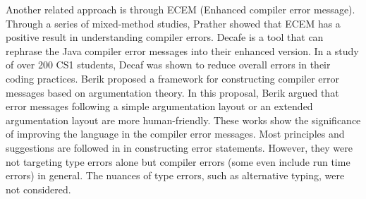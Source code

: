 Another related approach is through ECEM (Enhanced compiler error message). Through a series of mixed-method studies, Prather showed \cite{prather_novices_2017} that ECEM has a positive result in understanding compiler errors. Decafe \cite{becker_effective_2016} is a tool that can rephrase the Java compiler error messages into their enhanced version. In a study of over 200 CS1 students, Decaf was shown to reduce overall errors in their coding practices. Berik proposed a framework \cite{barik_how_2018} for constructing compiler error messages based on argumentation theory. In this proposal,  Berik argued that error messages following a simple argumentation layout or an extended argumentation layout are more human-friendly.  These works show the significance of improving the language in the compiler error messages. Most principles and suggestions are followed in \chameleon{} in constructing error statements. However, they were not targeting type errors alone but compiler errors (some even include run time errors) in general. The nuances of type errors, such as alternative typing, were not considered. 




